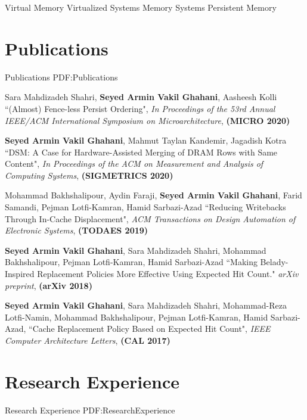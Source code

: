 \documentclass[a4paper,9pt,oneside]{article}
\begin{document}
\begin{body}
\BulletItem
Virtual Memory
\BulletItem
Virtualized Systems
\BulletItem
Memory Systems
\BulletItem
Persistent Memory

\section
{Publications}
{Publications}
{PDF:Publications}

\BulletItem
Sara Mahdizadeh Shahri,
\textbf{Seyed Armin Vakil Ghahani},
Aasheesh Kolli
``(Almost) Fence-less Persist Ordering", \textit{In Proceedings of the 53rd Annual IEEE/ACM International Symposium on Microarchitecture}, \textbf{(MICRO 2020)}

\BulletItem
\textbf{Seyed Armin Vakil Ghahani},
Mahmut Taylan Kandemir,
Jagadish Kotra
``DSM: A Case for Hardware-Assisted Merging of DRAM Rows with Same Content", \textit{In Proceedings of the ACM on Measurement and Analysis of Computing Systems}, \textbf{(SIGMETRICS 2020)}

\BulletItem
Mohammad Bakhshalipour,
Aydin Faraji,
\textbf{Seyed Armin Vakil Ghahani},
Farid Samandi,
Pejman Lotfi-Kamran,
Hamid Sarbazi-Azad
``Reducing Writebacks Through In-Cache Displacement", \textit{ACM Transactions on Design Automation of Electronic Systems}, \textbf{(TODAES 2019)}

\BulletItem
\textbf{Seyed Armin Vakil Ghahani},
Sara Mahdizadeh Shahri,
Mohammad Bakhshalipour,
Pejman Lotfi-Kamran,
Hamid Sarbazi-Azad
``Making Belady-Inspired Replacement Policies More Effective Using Expected Hit Count." \textit{arXiv preprint}, \textbf{(arXiv 2018)}


\BulletItem
\textbf{Seyed Armin Vakil Ghahani},
Sara Mahdizadeh Shahri,
Mohammad-Reza Lotfi-Namin,
Mohammad Bakhshalipour,
Pejman Lotfi-Kamran,
Hamid Sarbazi-Azad,
``Cache Replacement Policy Based on Expected Hit Count", \textit{IEEE Computer Architecture Letters}, \textbf{(CAL 2017)}



\section
{Research Experience}
{Research Experience}
{PDF:ResearchExperience}


\end{body}
\end{document}
